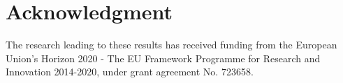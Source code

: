 \section*{Acknowledgment}\label{sec:acknowledgments}

The research leading to these results has received funding from the European Union's
Horizon 2020 - The EU Framework Programme for Research and Innovation 2014-2020,
under grant agreement No. 723658.
